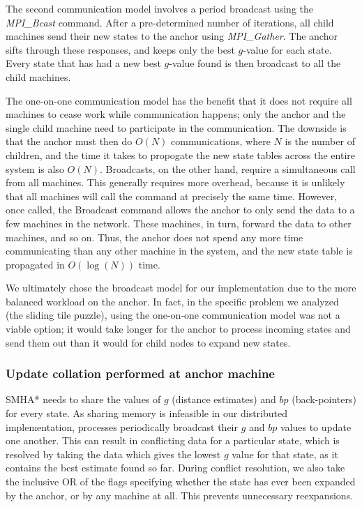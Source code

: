 \documentclass[11pt]{article}
\begin{document}
{The second communication model involves a period broadcast using the \emph{MPI\_Bcast} command. After a pre-determined number of iterations, all child machines send their new states to the anchor using \emph{MPI\_Gather}. The anchor sifts through these responses, and keeps only the best $g$-value for each state. Every state that has had a new best $g$-value found is then broadcast to all the child machines.

The one-on-one communication model has the benefit that it does not require all machines to cease work while communication happens; only the anchor and the single child machine need to participate in the communication. The downside is that the anchor must then do $O(N)$ communications, where $N$ is the number of children, and the time it takes to propogate the new state tables across the entire system is also $O(N)$. Broadcasts, on the other hand, require a simultaneous call from all machines. This generally requires more overhead, because it is unlikely that all machines will call the command at precisely the same time. However, once called, the Broadcast command allows the anchor to only send the data to a few machines in the network. These machines, in turn, forward the data to other machines, and so on. Thus, the anchor does not spend any more time communicating than any other machine in the system, and the new state table is propagated in $O(\log(N))$ time.

We ultimately chose the broadcast model for our implementation due to the more balanced workload on the anchor. In fact, in the specific problem we analyzed (the sliding tile puzzle), using the one-on-one communication model was not a viable option; it would take longer for the anchor to process incoming states and send them out than it would for child nodes to expand new states.

\subsubsection*{Update collation performed at anchor machine}

SMHA* needs to share the values of $g$ (distance estimates) and $bp$ (back-pointers) for every state. As sharing memory is infeasible in our distributed implementation, processes periodically broadcast their $g$ and $bp$ values to update one another. This can result in conflicting data for a particular state, which is resolved by taking the data which gives the lowest $g$ value for that state, as it contains the best estimate found so far. During conflict resolution, we also take the inclusive OR of the flags specifying whether the state has ever been expanded by the anchor, or by any machine at all. This prevents unnecessary reexpansions.

}
\end{document}
